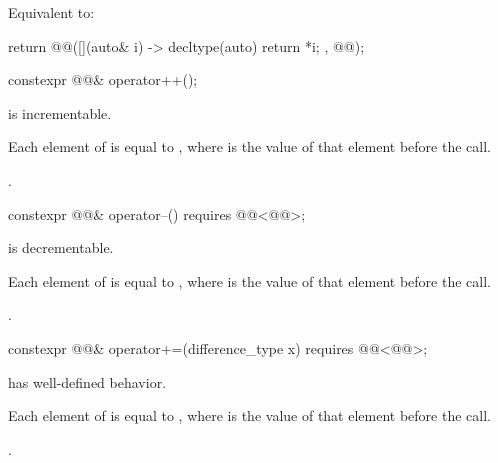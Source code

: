 \begin{itemdescr}
\pnum
\effects
Equivalent to:
\begin{codeblock}
return @@([](auto& i) -> decltype(auto) { return *i; }, @@);
\end{codeblock}
\end{itemdescr}

%
\begin{itemdecl}
constexpr @@& operator++();
\end{itemdecl}

\begin{itemdescr}
\pnum
\expects
{} is incrementable.

\pnum
\ensures
Each element of  is equal to ,
where  is the value of that element before the call.

\pnum
\returns
{}.
\end{itemdescr}

%
\begin{itemdecl}
constexpr @@& operator--() requires @@<@@>;
\end{itemdecl}

\begin{itemdescr}
\pnum
\expects
{} is decrementable.

\pnum
\ensures
Each element of  is equal to ,
where  is the value of that element before the call.

\pnum
\returns
{}.
\end{itemdescr}

%
\begin{itemdecl}
constexpr @@& operator+=(difference_type x)
  requires @@<@@>;
\end{itemdecl}

\begin{itemdescr}
\pnum
\expects
{} has well-defined behavior.

\pnum
\ensures
Each element of  is equal to ,
where  is the value of that element before the call.

\pnum
\returns
{}.
\end{itemdescr}

